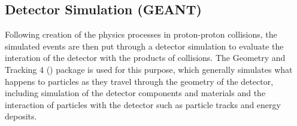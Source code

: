 \subsection{Detector Simulation (GEANT)}
\label{ss:detector_simulation}
Following creation of the physics processes in proton-proton collisions, the simulated events are then put
through a detector simulation to evaluate the interation of the detector with the products of collisions. The
Geometry and Tracking 4 (\GEANTfour) package is used for this purpose, which generally simulates what happens
to particles as they travel through the geometry of the detector, including simulation of the detector
components and materials and the interaction of particles with the detector such as particle tracks and energy
deposits.
